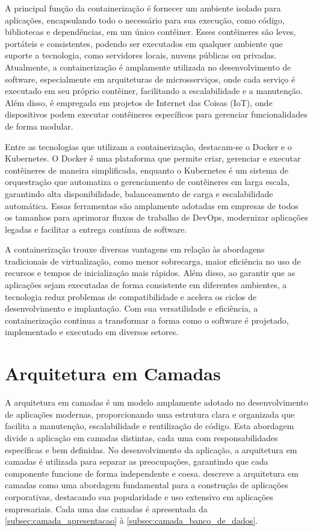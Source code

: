 A principal função da containerização é fornecer um ambiente isolado para aplicações, encapsulando todo o necessário para sua execução, como código, bibliotecas e dependências, em um único contêiner. Esses contêineres são leves, portáteis e consistentes, podendo ser executados em qualquer ambiente que suporte a tecnologia, como servidores locais, nuvens públicas ou privadas. Atualmente, a containerização é amplamente utilizada no desenvolvimento de software, especialmente em arquiteturas de microsserviços, onde cada serviço é executado em seu próprio contêiner, facilitando a escalabilidade e a manutenção. Além disso, é empregada em projetos de Internet das Coisas (IoT), onde dispositivos podem executar contêineres específicos para gerenciar funcionalidades de forma modular.

Entre as tecnologias que utilizam a containerização, destacam-se o Docker e o Kubernetes. O Docker é uma plataforma que permite criar, gerenciar e executar contêineres de maneira simplificada, enquanto o Kubernetes é um sistema de orquestração que automatiza o gerenciamento de contêineres em larga escala, garantindo alta disponibilidade, balanceamento de carga e escalabilidade automática. Essas ferramentas são amplamente adotadas em empresas de todos os tamanhos para aprimorar fluxos de trabalho de DevOps, modernizar aplicações legadas e facilitar a entrega contínua de software.

A containerização trouxe diversas vantagens em relação às abordagens tradicionais de virtualização, como menor sobrecarga, maior eficiência no uso de recursos e tempos de inicialização mais rápidos. Além disso, ao garantir que as aplicações sejam executadas de forma consistente em diferentes ambientes, a tecnologia reduz problemas de compatibilidade e acelera os ciclos de desenvolvimento e implantação. Com sua versatilidade e eficiência, a containerização continua a transformar a forma como o software é projetado, implementado e executado em diversos setores.

\section{Arquitetura em Camadas}

A arquitetura em camadas é um modelo amplamente adotado no desenvolvimento de aplicações modernas, proporcionando uma estrutura clara e organizada que facilita a manutenção, escalabilidade e reutilização de código. Esta abordagem divide a aplicação em camadas distintas, cada uma com responsabilidades específicas e bem definidas. No desenvolvimento da aplicação, a arquitetura em camadas é utilizada para separar as preocupações, garantindo que cada componente funcione de forma independente e coesa. \cite{Fowler02} descreve a arquitetura em camadas como uma abordagem fundamental para a construção de aplicações corporativas, destacando sua popularidade e uso extensivo em aplicações empresariais. Cada uma das camadas é apresentada da \autoref{subsec:camada_apresentacao} à \autoref{subsec:camada_banco_de_dados}.

